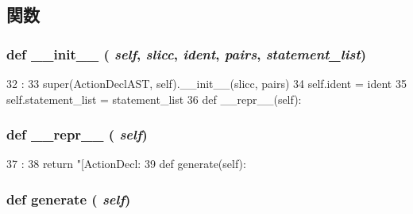 \subsection{関数}
\hypertarget{classslicc_1_1ast_1_1ActionDeclAST_1_1ActionDeclAST_ac775ee34451fdfa742b318538164070e}{
\subsubsection[{\_\-\_\-init\_\-\_\-}]{\setlength{\rightskip}{0pt plus 5cm}def \_\-\_\-init\_\-\_\- ( {\em self}, \/   {\em slicc}, \/   {\em ident}, \/   {\em pairs}, \/   {\em statement\_\-list})}}
\label{classslicc_1_1ast_1_1ActionDeclAST_1_1ActionDeclAST_ac775ee34451fdfa742b318538164070e}



\begin{DoxyCode}
32                                                            :
33         super(ActionDeclAST, self).__init__(slicc, pairs)
34         self.ident = ident
35         self.statement_list = statement_list
36 
    def __repr__(self):
\end{DoxyCode}
\hypertarget{classslicc_1_1ast_1_1ActionDeclAST_1_1ActionDeclAST_ad8b9328939df072e4740cd9a63189744}{
\subsubsection[{\_\-\_\-repr\_\-\_\-}]{\setlength{\rightskip}{0pt plus 5cm}def \_\-\_\-repr\_\-\_\- ( {\em self})}}
\label{classslicc_1_1ast_1_1ActionDeclAST_1_1ActionDeclAST_ad8b9328939df072e4740cd9a63189744}



\begin{DoxyCode}
37                       :
38         return "[ActionDecl: %
39 
    def generate(self):
\end{DoxyCode}
\hypertarget{classslicc_1_1ast_1_1ActionDeclAST_1_1ActionDeclAST_a4555d1cee0dccf3942ea35fe86de2e8e}{
\subsubsection[{generate}]{\setlength{\rightskip}{0pt plus 5cm}def generate ( {\em self})}}
\label{classslicc_1_1ast_1_1ActionDeclAST_1_1ActionDeclAST_a4555d1cee0dccf3942ea35fe86de2e8e}



